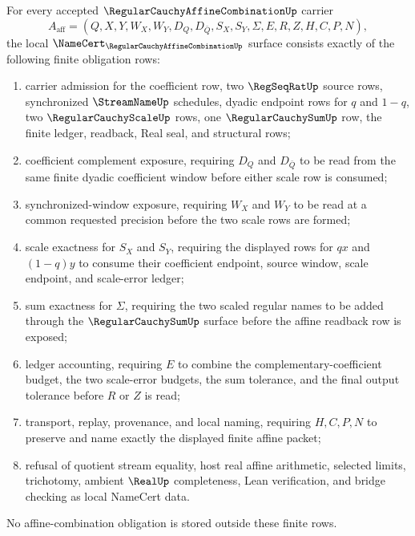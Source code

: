 \begin{theorem}
\label{thm:regular-cauchy-affine-combination-obligation-surface}
For every accepted $\RegularCauchyAffineCombinationUp$ carrier
$$
A_{\mathrm{aff}}=(Q,X,Y,W_X,W_Y,D_Q,D_{\bar Q},S_X,S_Y,\Sigma,E,R,Z,H,C,P,N),
$$
the local $\NameCert_{\RegularCauchyAffineCombinationUp}$ surface consists exactly of the following finite obligation rows:
\begin{enumerate}
\item carrier admission for the coefficient row, two $\RegSeqRatUp$ source rows, synchronized $\StreamNameUp$ schedules, dyadic endpoint rows for $q$ and $1-q$, two $\RegularCauchyScaleUp$ rows, one $\RegularCauchySumUp$ row, the finite ledger, readback, Real seal, and structural rows;
\item coefficient complement exposure, requiring $D_Q$ and $D_{\bar Q}$ to be read from the same finite dyadic coefficient window before either scale row is consumed;
\item synchronized-window exposure, requiring $W_X$ and $W_Y$ to be read at a common requested precision before the two scale rows are formed;
\item scale exactness for $S_X$ and $S_Y$, requiring the displayed rows for $q x$ and $(1-q)y$ to consume their coefficient endpoint, source window, scale endpoint, and scale-error ledger;
\item sum exactness for $\Sigma$, requiring the two scaled regular names to be added through the $\RegularCauchySumUp$ surface before the affine readback row is exposed;
\item ledger accounting, requiring $E$ to combine the complementary-coefficient budget, the two scale-error budgets, the sum tolerance, and the final output tolerance before $R$ or $Z$ is read;
\item transport, replay, provenance, and local naming, requiring $H,C,P,N$ to preserve and name exactly the displayed finite affine packet;
\item refusal of quotient stream equality, host real affine arithmetic, selected limits, trichotomy, ambient $\RealUp$ completeness, Lean verification, and bridge checking as local NameCert data.
\end{enumerate}
No affine-combination obligation is stored outside these finite rows.
\end{theorem}
